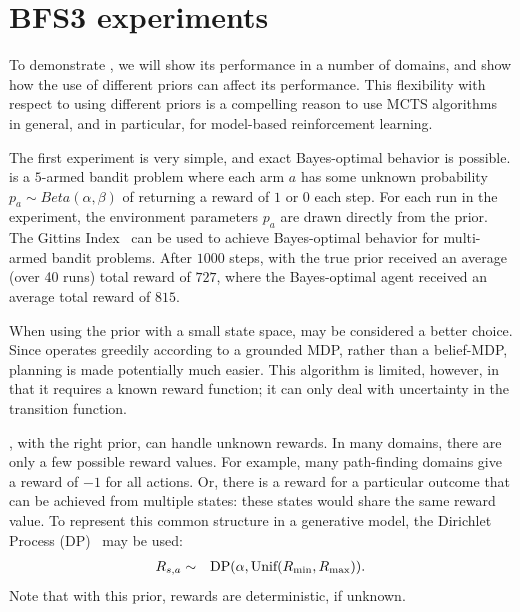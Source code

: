 \section{BFS3 experiments}

To demonstrate , we will show its performance in a number of domains, and show how the use of different priors can affect its performance.  This flexibility with respect to using different priors is a compelling reason to use MCTS algorithms in general, and  in particular, for model-based reinforcement learning.

The first experiment is very simple, and exact Bayes-optimal behavior is possible.  is a $5$-armed bandit problem where each arm $a$ has some unknown probability $p_a \sim Beta(\alpha,\beta)$ of returning a reward of $1$ or $0$ each step. For each run in the experiment, the environment parameters $p_a$ are drawn directly from the prior. The Gittins Index~\cite{gittins89} can be used to achieve Bayes-optimal behavior for multi-armed bandit problems. After $1000$ steps,  with the true prior received an average (over 40 runs) total reward of $727$, where the Bayes-optimal agent received an average total reward of $815$.


When using the  prior with a small state space,  may be considered a better choice. Since  operates greedily according to a grounded MDP, rather than a belief-MDP,  planning is made potentially much easier. This algorithm is limited, however, in that it requires a known reward function; it can only deal with uncertainty in the transition function.

, with the right prior, can handle unknown rewards. In many domains, there are only a few possible reward values. For example, many path-finding domains give a reward of $-1$ for all actions. Or, there is a reward for a particular outcome that can be achieved from multiple states: these states would share the same reward value.  To represent this common structure in a generative model, the Dirichlet Process (DP)~\cite{maceachern98} may be used:
\begin{eqnarray*}
R_{s,a} &\sim& \mbox{DP}(\alpha, \mbox{Unif}(R_{\rm min}, R_{\rm max})).
\end{eqnarray*}
Note that with this prior, rewards are deterministic, if unknown.

